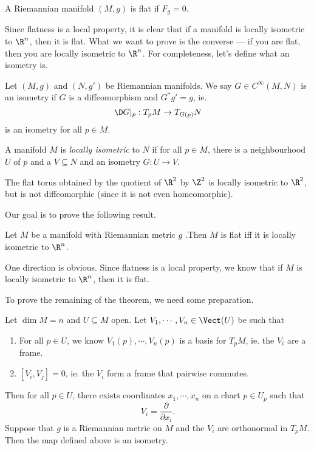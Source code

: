 \documentclass[a4paper]{article}
\begin{document}
\begin{defi}
  A Riemannian manifold $(M, g)$ is flat if $F_g = 0$.
\end{defi}

Since flatness is a local property, it is clear that if a manifold is locally isometric to $\R^n$, then it is flat. What we want to prove is the converse --- if you are flat, then you are locally isometric to $\R^n$. For completeness, let's define what an isometry is.

\begin{defi}[Isometry]
  Let $(M, g)$ and $(N, g')$ be Riemannian manifolds. We say $G \in C^\infty(M, N)$ is an isometry if $G$ is a diffeomorphism and $G^* g' = g$, ie.
  \[
    \D G|_p: T_p M \to T_{G(p)} N
  \]
  is an isometry for all $p \in M$.
\end{defi}

\begin{defi}
  A manifold $M$ is \emph{locally isometric} to $N$ if for all $p \in M$, there is a neighbourhood $U$ of $p$ and a $V \subseteq N$ and an isometry $G: U \to V$.
\end{defi}

\begin{eg}
  The flat torus obtained by the quotient of $\R^2$ by $\Z^2$ is locally isometric to $\R^2$, but is not diffeomorphic (since it is not even homeomorphic).
\end{eg}

Our goal is to prove the following result.
\begin{thm}
  Let $M$ be a manifold with Riemannian metric $g$ .Then $M$ is flat iff it is locally isometric to $\R^n$.
\end{thm}

One direction is obvious. Since flatness is a local property, we know that if $M$ is locally isometric to $\R^n$, then it is flat.

To prove the remaining of the theorem, we need some preparation.
\begin{prop}
  Let $\dim M = n$ and $U \subseteq M$ open. Let $V_1, \cdots, V_n \in \Vect(U)$ be such that
  \begin{enumerate}
    \item For all $p \in U$, we know $V_1(p), \cdots, V_n(p)$ is a basis for $T_pM$, ie. the $V_i$ are a frame.
    \item $[V_i, V_j] = 0$, ie. the $V_i$ form a frame that pairwise commutes.
  \end{enumerate}
  Then for all $p \in U$, there exists coordinates $x_1, \cdots, x_n$ on a chart $p \in U_p$ such that
  \[
    V_i = \frac{\partial}{\partial x_i}.
  \]
  Suppose that $g$ is a Riemannian metric on $M$ and the $V_i$ are orthonormal in $T_pM$. Then the map defined above is an isometry.
\end{prop}
\end{document}
